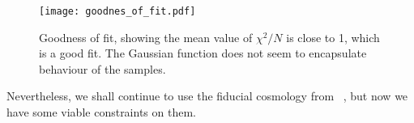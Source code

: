     \begin{figure}
        \texttt{[image: goodnes\_of\_fit.pdf]}
        \caption{Goodness of fit, showing the mean value of $\chi^2/N$ is close to 1, which is a good fit. The Gaussian function does not seem to encapsulate behaviour of the samples.}
        \label{fig:m1:goodness_of_fit}
    \end{figure}

    Nevertheless, we shall continue to use the fiducial cosmology from ~\cite{Betoule_2014}, but now we have some viable constraints on them. 
    